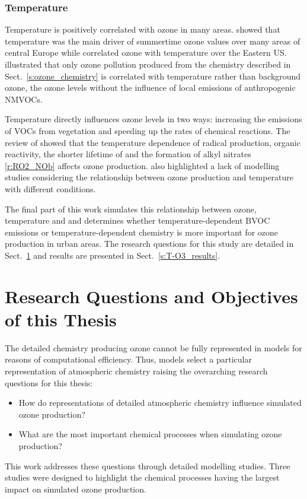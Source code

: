 \vspace{-4mm}
\subsubsection{Temperature}
Temperature is positively correlated with ozone in many areas.
\citet{Otero:2016} showed that temperature was the main driver of summertime ozone values over many areas of central Europe while \citet{Camalier:2007} correlated ozone with temperature over the Eastern US.
\citet{Sillman:1995a} illustrated that only ozone pollution produced from the chemistry described in Sect.~\ref{s:ozone_chemistry} is correlated with temperature rather than background ozone, the ozone levels without the influence of local emissions of anthropogenic NMVOCs.

\newpage
Temperature directly influences ozone levels in two ways: increasing the emissions of VOCs from vegetation and speeding up the rates of chemical reactions.
The review of \citet{Pusede:2015} showed that the temperature dependence of radical production, organic reactivity, the shorter lifetime of  and the formation of alkyl nitrates \eqref{r:RO2_NOb} affects ozone production.
\citet{Pusede:2015} also highlighted a lack of modelling studies considering the relationship between ozone production and temperature with different  conditions.

The final part of this work simulates this relationship between ozone, temperature and  and determines whether temperature-dependent BVOC emissions or temperature-dependent chemistry is more important for ozone production in urban areas.
The research questions for this study are detailed in Sect.~\ref{s:research_questions} and results are presented in Sect.~\ref{s:T-O3_results}.

\vspace{-5mm}
\section{Research Questions and Objectives of this Thesis} \label{s:research_questions}
\vspace{-4mm}
The detailed chemistry producing ozone cannot be fully represented in models for reasons of computational efficiency.
Thus, models select a particular representation of atmospheric chemistry raising the overarching research questions for this thesis:
\begin{itemize}
    \item How do representations of detailed atmospheric chemistry influence simulated ozone production?
    \item What are the most important chemical processes when simulating ozone production?
\end{itemize}
This work addresses these questions through detailed modelling studies. 
Three studies were designed to highlight the chemical processes having the largest impact on simulated ozone production.

